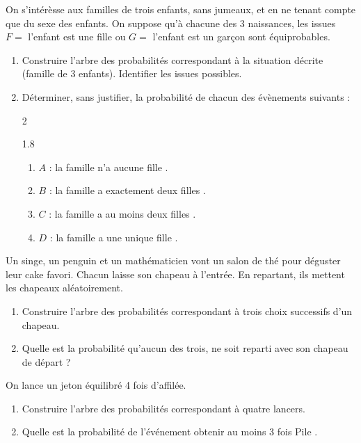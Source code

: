 \documentclass[main.tex]{subfiles}
\begin{document}
 \begin{exercise}  On s'intérèsse aux familles de trois enfants,   sans jumeaux, et en ne tenant compte que du sexe des enfants.  
	On suppose qu'à chacune des 3 naissances, les issues $F=$  \og l'enfant est une fille \fg{} ou $G=$  \og l'enfant est un garçon \fg{} sont équiprobables.
	\begin{enumerate}[label={\arabic*)},leftmargin=*] 
		\item Construire l'arbre des probabilités correspondant à la situation décrite (famille de 3 enfants). Identifier les issues possibles.
		\item Déterminer, sans justifier, la probabilité de chacun des évènements suivants :
			\vspace{-0.5em}
		\begin{multicols}{2}
			\begin{spacing}{1.8}
				\begin{enumerate}[ label={},leftmargin=*] 
					\item $A$ : \og la famille n'a aucune fille \fg{}.
					\item $B$ : \og la famille a exactement deux filles \fg{}.
					\item $C$ : \og la famille a au moins deux filles \fg{}.
					\item $D$ : \og la famille a une unique fille \fg{}.
				\end{enumerate}
			\end{spacing}
		\end{multicols}
		\vspace{-1em} 
	\end{enumerate} 
\end{exercise}
\begin{exercise} Un singe, un penguin et un mathématicien vont un salon de thé pour déguster leur cake favori. Chacun laisse son chapeau à l'entrée. En repartant, ils mettent les chapeaux aléatoirement.
\begin{enumerate}[label={\arabic*)},leftmargin=*] 
		\item Construire l'arbre des probabilités correspondant à trois choix successifs d'un chapeau.
		\item Quelle est la probabilité qu'aucun des trois, ne soit reparti avec son chapeau de départ ? 
 \end{enumerate}  
\end{exercise}
\begin{exercise} On lance un jeton équilibré 4 fois d’affilée.
	\begin{enumerate}[label={\arabic*)},leftmargin=*] 
		\item Construire l'arbre des probabilités correspondant à quatre lancers.
		\item  Quelle est la probabilité de l’événement \og obtenir au moins 3 fois Pile \fg{}.
	\end{enumerate}    
\end{exercise}
\end{document}
